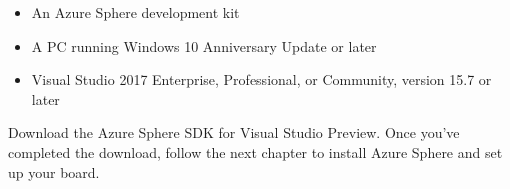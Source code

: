 \begin{itemize}
    \item An Azure Sphere development kit
    \item A PC running Windows 10 Anniversary Update or later
    \item Visual Studio 2017 Enterprise, Professional, or Community, version 15.7 or later
\end{itemize}

Download the Azure Sphere SDK for Visual Studio Preview.
Once you’ve completed the download, follow the next chapter to install Azure Sphere and set up your board.